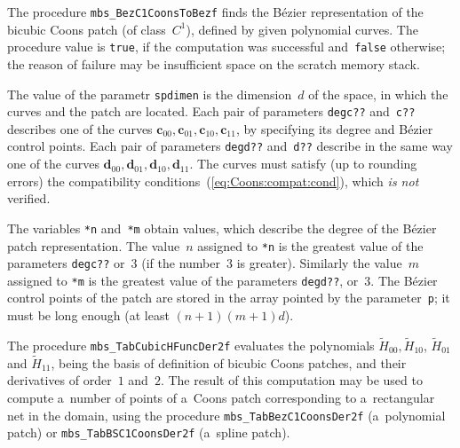 \vspace{\bigskipamount}
The procedure \texttt{mbs\_BezC1CoonsToBezf} finds the B\'{e}zier
representation of the bicubic Coons patch (of class~$C^1$), defined by
given polynomial curves. The procedure value is \texttt{true}, if the
computation was successful and~\texttt{false} otherwise; the reason
of failure may be insufficient space on the scratch memory stack.

The value of the parametr \texttt{spdimen} is the dimension~$d$ of the space,
in which the curves and the patch are located. Each pair of parameters
\texttt{degc??} and~\texttt{c??} describes one of the curves
$\bm{c}_{00},\bm{c}_{01},\bm{c}_{10},\bm{c}_{11}$, by specifying its
degree and B\'{e}zier control points. Each pair of parameters
\texttt{degd??} and~\texttt{d??} describe in the same way one of the curves
$\bm{d}_{00},\bm{d}_{01},\bm{d}_{10},\bm{d}_{11}$. The curves must
satisfy (up to rounding errors) the compatibility
conditions~(\ref{eq:Coons:compat:cond}), which \emph{is not} verified.

The variables \texttt{*n} and~\texttt{*m} obtain values, which describe
the degree of the B\'{e}zier patch representation.
The value~$n$ assigned to \texttt{*n} is the greatest value of
the parameters \texttt{degc??} or~$3$ (if the number~$3$ is greater).
Similarly the value~$m$ assigned to \texttt{*m} is the greatest value
of the parameters \texttt{degd??}, or~$3$. The B\'{e}zier control points
of the patch are stored in the array pointed by the parameter~\texttt{p};
it must be long enough (at least $(n+1)(m+1)d$).

\vspace{\bigskipamount}
The procedure \texttt{mbs\_TabCubicHFuncDer2f} evaluates the polynomials
$\tilde{H}_{00},\tilde{H}_{10}$, $\tilde{H}_{01}$ and $\tilde{H}_{11}$,
being the basis of definition of bicubic Coons patches, and their
derivatives of order~$1$ and~$2$. The result of this computation may be used
to compute a~number of points of a~Coons patch corresponding to
a~rectangular net in the domain, using the procedure
\texttt{mbs\_TabBezC1CoonsDer2f} (a~polynomial patch) or
\texttt{mbs\_TabBSC1CoonsDer2f} (a~spline patch).

